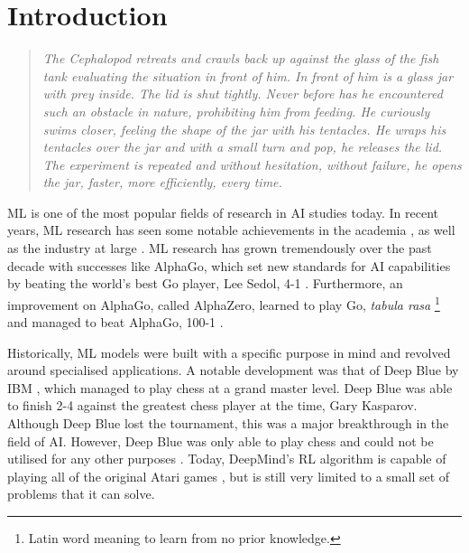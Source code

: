 \chapter{Introduction}
\label{chap:introduction}

\begin{quote}
      \textit{The Cephalopod retreats and crawls back up against the glass of the fish tank
            evaluating the situation in front of him. In front of him is a glass jar with
            prey inside. The lid is shut tightly. Never before has he encountered such an
            obstacle in nature, prohibiting him from feeding. He curiously swims closer,
            feeling the shape of the jar with his tentacles. He wraps his tentacles over the
            jar and with a small turn and pop, he releases the lid. The experiment is
            repeated and without hesitation, without failure, he opens the jar, faster, more
            efficiently, every time.}
\end{quote}

\Ac{ML} is one of the most popular fields of research in \ac{AI} studies today.
In recent years, \ac{ML} research has seen some notable achievements in the
academia \cite{ref:lecun:2015, ref:glorot:2010, ref:goodfellow:2014,
      ref:quoc:2017}, as well as the industry at large \cite{ref:silver:2016,
      ref:silver:2017, ref:zoph:2017, ref:lewis:2017}.  \ac{ML} research has grown
tremendously over the past decade with successes like AlphaGo, which set new
standards for \ac{AI} capabilities by beating the world's best Go player, Lee
Sedol, 4-1 \cite{ref:san-hun:2016}.  Furthermore, an improvement on AlphaGo,
called AlphaZero, learned to play Go, \textit{tabula rasa} \footnote{Latin word
      meaning to learn from no prior knowledge.} and managed to beat AlphaGo, 100-1
\cite{ref:silver:2017}.

Historically, \ac{ML} models were built with a specific purpose in mind and
revolved around specialised applications. A notable development was that of Deep
Blue by IBM \cite{ref:keene:1996}, which managed to play chess at a grand master
level. Deep Blue was able to finish 2-4 against the greatest chess player at the
time, Gary Kasparov. Although Deep Blue lost the tournament, this was a major
breakthrough in the field of \ac{AI}. However, Deep Blue was only able to play
chess and could not be utilised for any other purposes \cite{ref:kelley:2010}.
Today, DeepMind's \ac{RL} algorithm is capable of playing all of the original
Atari games \cite{ref:mnih:2013}, but is still very limited to a small set of
problems that it can solve.

